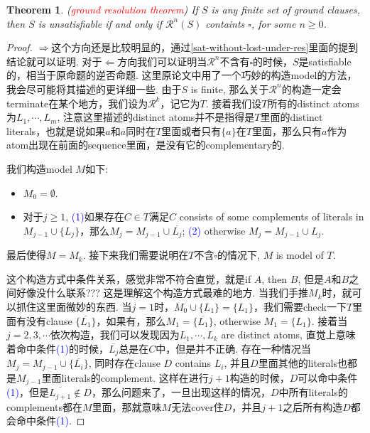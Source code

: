 \documentclass{article}
\theoremstyle{plain}
\newtheorem{theorem}{Theorem}
\theoremstyle{nonumberplain}
\newtheorem{proof}{Proof}
\newcommand{\redt}[1]{\textcolor{red}{#1}}
\newcommand{\bluet}[1]{\textcolor{blue}{#1}}
\begin{document}
\begin{theorem}
\rm \cite{resolution-principle} (\redt{ground resolution theorem}) If $S$ is any finite set of ground clauses, then $S$ is unsatisfiable if and only if $\mathcal{R}^n(S)$ containts $\square$, for some $n \geq 0$. 
\end{theorem}

\begin{proof}
\rm $\Rightarrow$这个方向还是比较明显的，通过\ref{sat-without-lost-under-res}里面的提到结论就可以证明. 对于$\Leftarrow$方向我们可以证明当$\mathcal{R}^n$不含有$\square$的时候，$S$是satisfiable的，相当于原命题的逆否命题. 这里原论文中用了一个巧妙的构造model的方法，我会尽可能将其描述的更详细一些. 由于$S$ is finite, 那么关于$\mathcal{R}^n$的构造一定会terminate在某个地方，我们设为$\mathcal{R}^k$，记它为$T$. 接着我们设$T$所有的distinct atoms为$L_1, \cdots, L_m$, 注意这里描述的distinct atoms并不是指得是$T$里面的distinct literals，也就是说如果$a$和$\overline{a}$同时在$T$里面或者只有$\{a\}$在$T$里面，那么只有$a$作为atom出现在前面的sequence里面，是没有它的complementary的. 

我们构造model $M$如下:
\begin{itemize}
	\item $M_0 = \emptyset$.
	\item 对于$j \geq 1$, \bluet{(1)}如果存在$C \in T$满足$C$ consists of some complements of literals in $M_{j-1} \cup \{L_j\}$，那么$M_j = M_{j-1} \cup \overline{L_j}$; \bluet{(2)} otherwise $M_j = M_{j-1} \cup L_j$.
\end{itemize}
最后使得$M = M_k$. 接下来我们需要说明在$T$不含$\square$的情况下, $M$ is model of $T$.

这个构造方式中条件关系，感觉非常不符合直觉，就是if $A$, then $B$, 但是$A$和$B$之间好像没什么联系??? 这是理解这个构造方式最难的地方. 当我们手推$M_k$时，就可以抓住这里面微妙的东西. 当$j = 1$时，$M_0 \cup \{L_1\} = \{L_1\}$，我们需要check一下$T$里面有没有clause $\{\overline{L_1}\}$，如果有，那么$M_1 = \{\overline{L_1}\}$, otherwise $M_1 = \{L_1\}$. 接着当$j = 2,3,\cdots$依次构造，我们可以发现因为$L_1,\cdots,L_k$ are distinct atoms, 直觉上意味着命中条件\bluet{(1)}的时候，$\overline{L_j}$总是在$C$中，但是并不正确. 存在一种情况当$M_{j} = M_{j-1} \cup \{\overline{L_i}\}$, 同时存在clause $D$ contains $L_i$, 并且$D$里面其他的literals也都是$M_{j-1}$里面literals的complement. 这样在进行$j+1$构造的时候，$D$可以命中条件\bluet{(1)}，但是$\overline{L_{j+1}} \notin D$，那么问题来了，一旦出现这样的情况，$D$中所有literals的complements都在$M$里面，那就意味$M$无法cover住$D$，并且$j+1$之后所有构造$D$都会命中条件\bluet{(1)}.


\end{proof}
\end{document}

